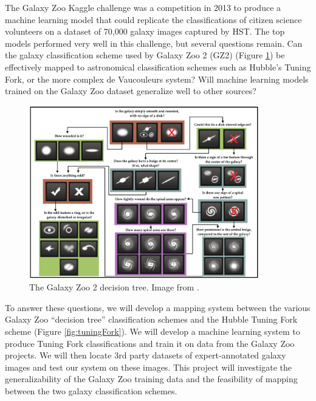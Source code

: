 \documentclass{article}
\begin{document}
The Galaxy Zoo Kaggle challenge was a competition in 2013 to produce a machine learning model that could replicate the classifications of citizen science volunteers on a dataset of 70,000 galaxy images captured by HST. The top models performed very well in this challenge, but several questions remain. Can the galaxy classification scheme used by Galaxy Zoo 2 (GZ2) (Figure \ref{fig:GZ2tree}) be effectively mapped to astronomical classification schemes such as Hubble's Tuning Fork, or the more complex de Vaucouleurs system? Will machine learning models trained on the Galaxy Zoo dataset generalize well to other sources? 


\begin{figure}[h]
  \centering
	\includegraphics[width=100mm]{../img/GZ2_tree.png}
  \caption{The Galaxy Zoo 2 decision tree. Image from \cite{2013MNRAS.435.2835W}.}
  \label{fig:GZ2tree}
\end{figure}

To answer these questions, we will develop a mapping system between the various Galaxy Zoo “decision tree” classification schemes and the Hubble Tuning Fork scheme (Figure \ref{fig:tuningFork}). We will develop a machine learning system to produce Tuning Fork classifications and train it on data from the Galaxy Zoo projects. We will then locate 3rd party datasets of expert-annotated galaxy images and test our system on these images. This project will investigate the generalizability of the Galaxy Zoo training data and the feasibility of mapping between the two galaxy classification schemes. 
\end{document}
